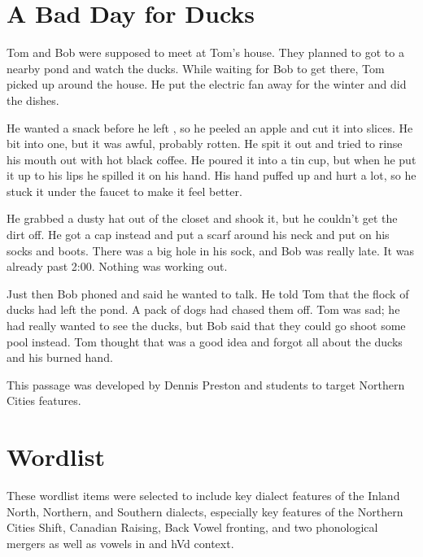 \section{A Bad Day for Ducks}

Tom and Bob were supposed to meet at Tom's house. They planned to got to a nearby pond and watch the ducks. While waiting for Bob to get there, Tom picked up around the house. He put the electric fan away for the winter and did the dishes.

He wanted a snack before he left , so he peeled an apple and cut it into slices. He bit into one, but it was awful, probably rotten. He spit it out and tried to rinse his mouth out with hot black coffee. He poured it into a tin cup, but when he put it up to his lips he spilled it on his hand. His hand puffed up and hurt a lot, so he stuck it under the faucet to make it feel better.

He grabbed a dusty hat out of the closet and shook it, but he couldn't get the dirt off. He got a cap instead and put a scarf around his neck and put on his socks and boots. There was a big hole in his sock, and Bob was really late. It was already past 2:00. Nothing was working out.

Just then Bob phoned and said he wanted to talk. He told Tom that the flock of ducks had left the pond. A pack of dogs had chased them off. Tom was sad; he had really wanted to see the ducks, but Bob said that they could go shoot some pool instead. Tom thought that was a good idea and forgot all about the ducks and his burned hand.

\vspace{11pt}

\noindent This passage was developed by Dennis Preston and students to target Northern Cities features.


\section{Wordlist}

These wordlist items were selected to include key dialect features of the Inland North, Northern, and Southern dialects, especially key features of the Northern Cities Shift, Canadian Raising, Back Vowel fronting, and two phonological mergers as well as vowels in and hVd context.
\vspace{11pt}

